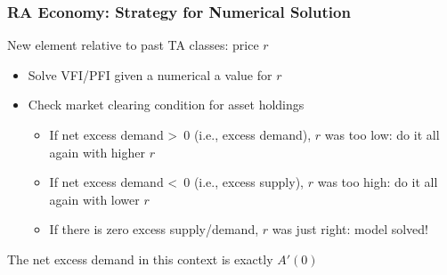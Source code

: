 \documentclass[10pt, aspectratio=1610, natbib, handout]{beamer}
\begin{document}
  \begin{frame}
    \frametitle{RA Economy: Strategy for Numerical Solution}

    New element relative to past TA classes: price $r$
    \begin{itemize}
      \item Solve VFI/PFI given a numerical a value for $r$
      \item Check market clearing condition for asset holdings
        \begin{itemize}
          \item If net excess demand \textgreater\ 0 (i.e., excess demand), $r$ was too low: do it all again with higher $r$
          \item If net excess demand \textless\ 0 (i.e., excess supply), $r$ was too high: do it all again with lower $r$
          \item If there is zero excess supply/demand, $r$ was just right: model solved!
        \end{itemize}
    \end{itemize}

    \vfill\pause

    The net excess demand in this context is exactly $A'(0)$

    \vfill\pause


  \end{frame}
\end{document}
